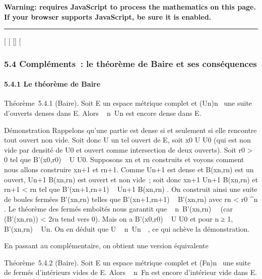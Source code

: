 \textbf{Warning: 
requires JavaScript to process the mathematics on this page.\\ If your
browser supports JavaScript, be sure it is enabled.}

\begin{center}\rule{3in}{0.4pt}\end{center}

{[}
{[}
{[}{]}
{[}

\subsubsection{5.4 Compléments~: le théorème de Baire et ses
conséquences}

\paragraph{5.4.1 Le théorème de Baire}

Théorème~5.4.1 (Baire). Soit E un espace métrique complet et
(Un)n\in{}~ une suite d'ouverts denses dans E. Alors
\⋂ ~
n\in{}~Un est encore dense dans E.

Démonstration Rappelons qu'une partie est dense si et seulement si elle
rencontre tout ouvert non vide. Soit donc U un tel ouvert de E, soit
x0 \in U \bigcap U0 (qui est non vide par densité de
U0 et ouvert comme intersection de deux ouverts). Soit
r0 \textgreater{} 0 tel que B'(x0,r0) \subset~ U
\bigcap U0. Supposons xn et rn construits et
voyons comment nous allons construire xn+1 et rn+1.
Comme Un+1 est dense et B(xn,rn) est un
ouvert, Un+1 \bigcap B(xn,rn) est ouvert et non
vide~; soit donc xn+1 \in Un+1 \bigcap
B(xn,rn) et rn+1 \textless{}
rn  tel que
B'(xn+1,rn+1) \subset~ Un+1 \bigcap
B(xn,rn) . On construit ainsi une suite de boules
fermées B'(xn,rn) telles que
B'(xn+1,rn+1) \subset~ B'(xn,rn) avec
rn \textless{} r0 ^n . Le théorème des fermés emboîtés nous garantit que
\⋂ ~
n\in{}~B'(xn,rn)\neq~\varnothing~
(car \delta(B'(xn,rn)) \textless{} 2rn tend
vers 0). Mais on a B'(x0,r0) \subset~ U \bigcap U0 et
pour n ≥ 1, B'(xn,rn) \subset~ Un. On en déduit
que U \bigcap\⋂ ~
n\in{}~Un\neq~\varnothing~, ce qui achève la
démonstration.

En passant au complémentaire, on obtient une version équivalente

Théorème~5.4.2 (Baire). Soit E un espace métrique complet et
(Fn)n\in{}~ une suite de fermés d'intérieurs vides de E.
Alors \⋃ ~
n\in{}~Fn est encore d'intérieur vide dans E.


